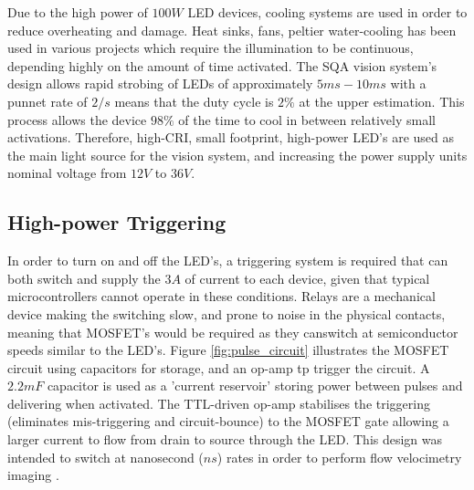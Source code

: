 \documentclass[fleqn,twoside,12pt]{report}
\begin{document}
Due to the high power of $100W$ LED devices, cooling systems are used in order to reduce overheating and damage. Heat sinks, fans, peltier water-cooling has been used in various projects which require the illumination to be continuous, depending highly on the amount of time activated. The SQA vision system's design allows rapid strobing of LEDs of approximately $5ms-10ms$ with a punnet rate of $2/s$ means that the duty cycle is $2\%$ at the upper estimation. This process allows the device $98\%$ of the time to cool in between relatively small activations. Therefore, high-CRI, small footprint, high-power LED's are used as the main light source for the vision system, and increasing the power supply units nominal voltage from $12V$ to $36V$.



\subsection{High-power Triggering}
 

In order to turn on and off the LED's, a triggering system is required that can both switch and supply the $3A$ of current to each device, given that typical microcontrollers cannot operate in these conditions. Relays are a mechanical device making the switching slow, and prone to noise in the physical contacts, meaning that MOSFET's would be required as they canswitch at semiconductor speeds similar to the LED's. Figure \ref{fig:pulse_circuit} illustrates the MOSFET circuit using capacitors for storage, and an op-amp tp trigger the circuit. A $2.2mF$ capacitor is used as a 'current reservoir' storing power between pulses and delivering when activated. The TTL-driven op-amp stabilises the triggering (eliminates mis-triggering and circuit-bounce) to the MOSFET gate allowing a larger current to flow from drain to source through the LED. This design was intended to switch at nanosecond ($ns$) rates in order to perform flow velocimetry imaging \cite{willert}. 
\end{document}
